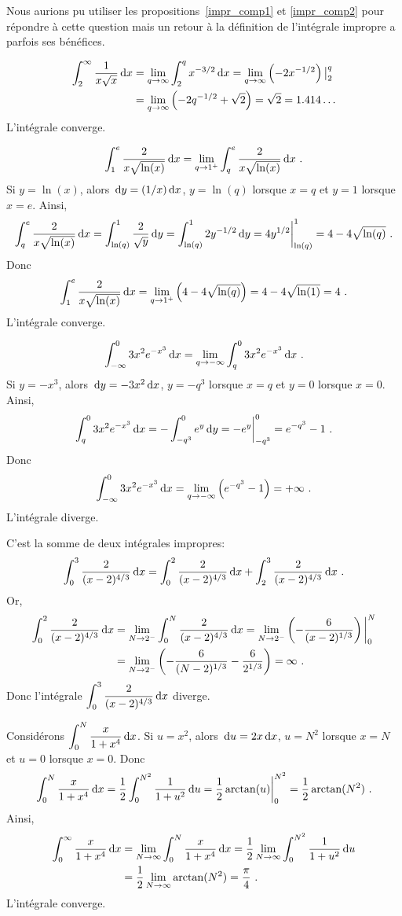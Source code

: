 {Nous aurions pu utiliser les propositions~\ref{impr_comp1} et
\ref{impr_comp2} pour répondre à cette question mais un retour à la
définition de l'intégrale impropre a parfois ses bénéfices.

\begin{align*}
\int_2^\infty \frac{1}{x\sqrt{x}} \,\mathrm{d}x
&= \lim_{q \rightarrow \infty} \int_2^q x^{-3/2} \,\mathrm{d}x
= \lim_{q \rightarrow \infty} \left( -2x^{-1/2} \right)\big|_2^q \\
&= \lim_{q \rightarrow \infty} \left( -2q^{-1/2} + \sqrt{2}\right)
= \sqrt{2} = 1.414\ldots
\end{align*}
L'intégrale converge.

\[
\int_1^e \frac{2}{x\sqrt{\ln(x)}} \,\mathrm{d}x = \lim_{q\to 1^+} \int_q^e
\frac{2}{x\sqrt{\ln(x)}} \,\mathrm{d}x \ .
\]
Si $y=\ln(x)$, alors $\,\mathrm{d}y = (1/x)\,\mathrm{d}x$,
$y=\ln(q)$ lorsque $x=q$ et $y=1$ lorsque $x=e$.  Ainsi,
\[
\int_q^e \frac{2}{x\sqrt{\ln(x)}} \,\mathrm{d}x
= \int_{\ln(q)}^1 \frac{2}{\sqrt{y}} \,\mathrm{d}y
= \int_{\ln(q)}^1 2 y^{-1/2} \,\mathrm{d}y
= 4 y^{1/2} \bigg|_{\ln(q)}^1
= 4 - 4 \sqrt{\ln(q)} \ .
\]
Donc
\[
\int_1^e \frac{2}{x\sqrt{\ln(x)}} \,\mathrm{d}x
= \lim_{q\to 1^+} \left( 4 - 4 \sqrt{\ln(q)} \right)
= 4 - 4 \sqrt{\ln(1)} = 4 \ .
\]
L'intégrale converge.

\[
\int_{-\infty}^0 3x^2 e^{-x^3} \,\mathrm{d}x = \lim_{q\to -\infty}
\int_q^0 3x^2 e^{-x^3} \,\mathrm{d}x \ .
\]
Si $y=-x^3$, alors $\,\mathrm{d}y = -3 x^2 \,\mathrm{d}x$,
$y=-q^3$ lorsque $x=q$ et $y=0$ lorsque $x=0$.  Ainsi,
\[
\int_q^0 3x^2 e^{-x^3} \,\mathrm{d}x =
-\int_{-q^3}^0 e^y \,\mathrm{d}y = -e^y \bigg|_{-q^3}^0
= e^{-q^3} - 1 \ .
\]
Donc
\[
\int_{-\infty}^0 3x^2 e^{-x^3} \,\mathrm{d}x = \lim_{q\to -\infty}
\left( e^{-q^3} - 1 \right) = +\infty \ .
\]
L'intégrale diverge.

 C'est la somme de deux intégrales impropres:
\[
\int_0^3\frac{2}{(x-2)^{4/3}}\,\mathrm{d}x = \int_0^2\frac{2}{(x-2)^{4/3}}\,\mathrm{d}x
+ \int_2^3\frac{2}{(x-2)^{4/3}}\,\mathrm{d}x \ .
\]
Or,
\begin{align*}
\int_0^2\frac{2}{(x-2)^{4/3}}\,\mathrm{d}x
&= \lim_{N\rightarrow 2^-} \int_0^N\frac{2}{(x-2)^{4/3}}\,\mathrm{d}x
= \lim_{N\rightarrow 2^-} \left(-\frac{6}{(x-2)^{1/3}}\right) \bigg|_0^N \\
&= \lim_{N\rightarrow 2^-} \left(- \frac{6}{(N-2)^{1/3}}
- \frac{6}{2^{1/3}} \right) = \infty \ .
\end{align*}
Donc l'intégrale $\displaystyle \int_0^3\frac{2}{(x-2)^{4/3}}\,\mathrm{d}x$ diverge.

 Considérons $\displaystyle \int_0^N \frac{x}{1+x^4} \,\mathrm{d}x$.
Si $u=x^2$, alors $\,\mathrm{d}u=  2x \,\mathrm{d}x$, $u = N^2$ lorsque $x=N$ et
$u=0$ lorsque $x=0$.  Donc
\[
\int_0^N \frac{x}{1+x^4} \,\mathrm{d}x
= \frac{1}{2} \int_0^{N^2} \frac{1}{1+u^2} \,\mathrm{d}u
= \frac{1}{2} \arctan(u) \bigg|_0^{N^2}
= \frac{1}{2} \arctan(N^2) \ .
\]
Ainsi,
\begin{align*}
\int_0^\infty \frac{x}{1+x^4} \,\mathrm{d}x
&= \lim_{N\to \infty} \int_0^N \frac{x}{1+x^4} \,\mathrm{d}x
= \frac{1}{2} \lim_{N\rightarrow \infty} \int_0^{N^2} \frac{1}{1+u^2} \,\mathrm{d}u \\
&= \frac{1}{2} \lim_{N\rightarrow \infty} \arctan(N^2)
= \frac{\pi}{4} \ .
\end{align*}
L'intégrale converge.

}
